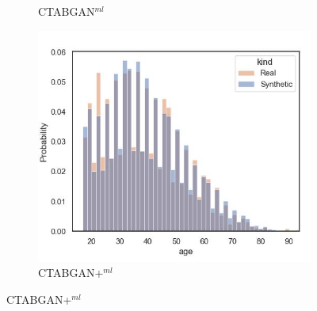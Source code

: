 \begin{figure}[h]
\begin{subfigure}{0.32\textwidth}
		\caption{CTABGAN$^{ml}$}
	\end{subfigure}
	\begin{subfigure}{0.32\textwidth}
		\centering
		\includegraphics[width=\textwidth]{images/dist_age/ctabgan+.jpg}
		\caption{CTABGAN+$^{ml}$}
	\end{subfigure}



\end{figure}
